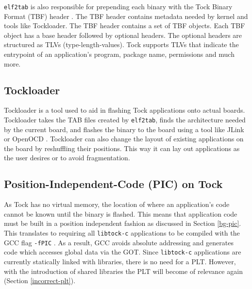 \documentclass[12pt]{ucsddissertation}
\begin{document}
\texttt{elf2tab} is also responsible for prepending each binary with the Tock Binary Format (TBF) header \cite{tbf}. The TBF header contains metadata needed by kernel and tools like Tockloader. The TBF header contains a set of TBF objects. Each TBF object has a base header followed by optional headers. The optional headers are structured as TLVs (type-length-values). Tock supports TLVs that indicate the entrypoint of an application's program, package name, permissions and much more. 

\subsection{Tockloader} \label{tockloader-bg}

Tockloader is a tool used to aid in flashing Tock applications onto actual boards. Tockloader takes the TAB files created by \texttt{elf2tab}, finds the architecture needed by the current board, and flashes the binary to the board using a tool like JLink or OpenOCD \cite{jlink, openocd}. Tockloader can also change the layout of existing applications on the board by reshuffling their positions. This way it can lay out applications as the user desires or to avoid fragmentation. 

\subsection{Position-Independent-Code (PIC) on Tock} \label{tock-pic}

As Tock has no virtual memory, the location of where an application's code cannot be known until the binary is flashed. This means that application code must be built in a position independent fashion as discussed in Section \ref{bg-pic}. This translates to requiring all \texttt{libtock-c} applications to be compiled with the GCC flag \texttt{-fPIC} \cite{tock-compilation, gcc-codegen}. As a result, GCC avoids absolute addressing and generates code which accesses global data via the GOT. Since \texttt{libtock-c} applications are currently statically linked with libraries, there is no need for a PLT. However, with the introduction of shared libraries the PLT will become of relevance again (Section \ref{incorrect-plt}).
\end{document}
